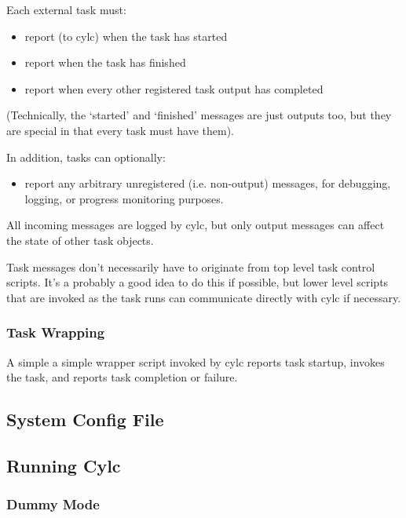 \documentclass[11pt,a4paper]{article}
\begin{document}
Each external task must:

\begin{itemize}
\item report (to cylc) when the task has started
\item report when the task has finished
\item report when every other registered task output has
completed
\end{itemize}

(Technically, the `started' and `finished' messages are just
outputs too, but they are special in that every task
must have them).

In addition, tasks can optionally:

\begin{itemize}
\item report any arbitrary unregistered (i.e. non-output)
messages, for debugging, logging, or progress monitoring purposes.
\end{itemize}

All incoming messages are logged by cylc, but only output messages can
affect the state of other task objects.

Task messages don't necessarily have to originate from top level task
control scripts. It's a probably a good idea to do this if possible, but
lower level scripts that are invoked as the task runs can communicate
directly with cylc if necessary.

\subsubsection{Task Wrapping}

A simple a simple wrapper script invoked by cylc reports task
startup, invokes the task, and reports task completion or failure. 

\pagebreak
\subsection{System Config File}

{
\color{Magenta}

}



\subsection{Running Cylc}

\label{sec:dummymode}
\subsubsection{Dummy Mode}
\end{document}
